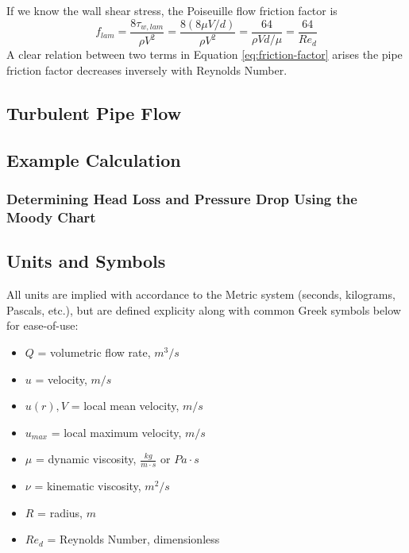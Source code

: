 \documentclass[11pt]{article} %
\numberwithin{equation}{section} %
\begin{document}
If we know the wall shear stress, the Poiseuille flow friction factor is
\begin{equation} \label{eq:friction-factor}
f_{lam} = \frac{8 \tau_{w, lam}}{\rho V^{2}} = \frac{8(8 \mu V/d)}{\rho V^{2}} = \frac{64}{\rho V d/\mu} = \frac{64}{Re_{d}}
\end{equation}	
A clear relation between two terms in Equation \ref{eq:friction-factor} arises \textemdash{} the pipe friction factor decreases inversely with Reynolds Number.
\subsection{Turbulent Pipe Flow}


\subsection{Example Calculation}
\subsubsection{Determining Head Loss and Pressure Drop Using the Moody Chart}

\subsection{Units and Symbols} \label{sec:units}
All units are implied with accordance to the Metric system (seconds, kilograms, Pascals, etc.), but are defined explicity along with common Greek symbols below for ease-of-use:
\begin{itemize}%
\item $Q$ = volumetric flow rate, $m^{3}/s$
\item $u$ = velocity, $m/s$ 
\item $u(r), V$ = local mean velocity, $m/s$ 
\item $u_{max}$ = local maximum velocity, $m/s$ 
\item $\mu$ = dynamic viscosity, $\frac{kg}{m \cdot s}$ or $Pa \cdot s$
\item $\nu$ = kinematic viscosity, $m^{2}/s$
\item $R$ = radius, $m$
\item $Re_{d}$ = Reynolds Number, dimensionless%

\end{itemize}
\printbibliography
\end{document}
